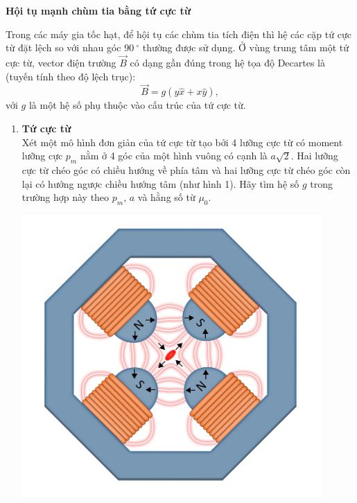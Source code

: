 \textbf{Hội tụ mạnh chùm tia bằng tứ cực từ}

Trong các máy gia tốc hạt, để hội tụ các chùm tia tích điện thì hệ các cặp tứ cực từ đặt lệch so với nhau góc $\SI{90}{^\circ}$ thường được sử dụng. Ở vùng trung tâm một tứ cực từ, vector điện trường $\Vec{B}$ có dạng gần đúng trong hệ tọa độ Decartes là (tuyến tính theo độ lệch trục):
\begin{equation*}
    \Vec{B} = g \left( y \hat{x} + x \hat{y} \right),
\end{equation*}
với $g$ là một hệ số phụ thuộc vào cấu trúc của tứ cực từ.

\begin{enumerate}
    \item \textbf{Tứ cực từ} \\
    Xét một mô hình đơn giản của tứ cực từ tạo bởi 4 lưỡng cực từ có moment lưỡng cực $p_m$ nằm ở 4 góc của một hình vuông có cạnh là $a \sqrt{2}$. Hai lưỡng cực từ chéo góc có chiều hướng về phía tâm và hai lưỡng cực từ chéo góc còn lại có hướng ngược chiều hướng tâm (như hình 1). Hãy tìm hệ số $g$ trong trường hợp này theo $p_m$, $a$ và hằng số từ $\mu_0$.
\begin{center}
\begin{minipage}{0.4\textwidth}
\includegraphics[width=0.9\textwidth]{Problem_18/quadrupoles.png}
\end{minipage}
\begin{minipage}{0.4\textwidth}
\centering
\begin{tikzpicture}[scale=0.7]

\end{tikzpicture}
\end{minipage}
\end{center}
\end{enumerate}
